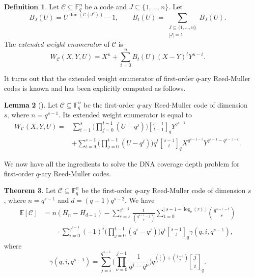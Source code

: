 \documentclass[11pt,a4paper,reqno,twoside]{article}
\theoremstyle{definition}
\newtheorem{theorem}{Theorem}[section]
\newtheorem{lemma}[theorem]{Lemma}
\newtheorem{definition}[theorem]{Definition}
\newcommand{\F}{\mathbb{F}}
\newcommand{\E}{\mathbb{E}}
\newcommand{\mC}{\mathcal{C}}
\newcommand{\qbinom}[2]{\genfrac{[}{]}{0pt}{}{#1}{#2}}
\begin{document}
\begin{definition}
    Let $\mC \subseteq \F_q^n$ be a code and $J \subseteq \{1, \dots, n\}$. Let
    \[
    B_J(U) = U^{\dim(\mC(J^{\mathsf{c}}))}-1, \quad  \quad B_t(U) = \sum_{\substack{J \subseteq \{1, \dots, n\} \\ |J| =t}} B_J(U).
    \]
    The \emph{extended weight enumerator} of $\mC$ is
    \[
    W_{\mC}(X,Y,U) = X^n + \sum_{t=0}^n B_t(U) (X-Y)^t Y^{n-t}.
    \]
\end{definition}



It turns out that
the extended weight enumerator
of first-order $q$-ary Reed-Muller codes 
is known and has been explicitly computed as follows.

\begin{lemma}[]  
Let $\mC \subseteq \F_q^n$ be the first-order $q$-ary Reed-Muller code of dimension $s$, where $n = q^{s-1}$.
    Its extended weight enumerator
    is equal to
    \begin{equation} \label{ext_enum_RM}
        \begin{split}
        W_{\mC}(X,Y,U) = &\sum_{t=1}^s  \Bigg( \prod_{j=0}^{t-1} (U - q^j) \Bigg) \qbinom{s-1}{t-1}_q Y^{q^{s-1}} \\
        &+ \sum_{t=0}^{s-1} \Bigg( \prod_{j=0}^{t-1} (U - q^j) \Bigg) q^t \qbinom{s-1}{t}_q X^{q^{s-1-t}} Y^{q^{s-1}-q^{s-1-t}}. 
    \end{split}
    \end{equation}
\end{lemma}


We now have all the ingredients to solve the DNA coverage depth problem for first-order $q$-ary Reed-Muller codes.
\begin{theorem} \label{exp_RM}
    Let $\mC \subseteq \F_q^n$ be the first-order $q$-ary Reed-Muller code of dimension $s$,
    where $n = q^{s-1}$ and $d=(q-1)q^{s-2}$. We have
    \[
    \begin{split}
    \E[\mC] &= n(H_n - H_{d-1}) - \sum_{r=s}^{q^{s-2}} \frac{1}{\binom{q^{s-1}-1}{r}} \sum_{t=0}^{\lfloor s-1-\log_q(r) \rfloor} \binom{q^{s-1-t}}{r} \\
    & \qquad \cdot \sum_{i=0}^{q^{s-1}} (-1)^i  \Bigg( \prod_{j=0}^{t-1} (q^i - q^j) \Bigg) q^t \qbinom{s-1}{t}_q \gamma(q,i,q^{s-1}),
    \end{split}
    \]
where 
\[
\gamma(q,i,q^{s-1}) = \sum_{j=i}^{q^{s-1}} \Bigg( \prod_{\nu=0}^{j-1} \frac{1}{q^j - q^\nu} \Bigg) q^{\binom{j}{2} + \binom{j-i}{2}} \qbinom{j}{i}_q.
\]
\end{theorem}
\end{document}

